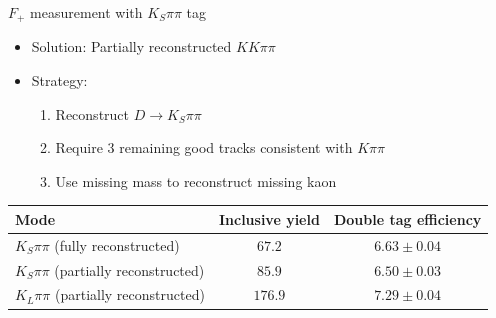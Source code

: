 \documentclass{beamer}
\begin{document}
\begin{frame}{$F_+$ measurement with $K_S\pi\pi$ tag}
  \begin{itemize}
    \setlength\itemsep{1.0em}
    \item{Solution: Partially reconstructed $KK\pi\pi$}
    \item{Strategy:}
    \begin{enumerate}
      \setlength\itemsep{0.5em}
      \item{Reconstruct $D\to K_S\pi\pi$}
      \item{Require 3 remaining good tracks consistent with $K\pi\pi$}
      \item{Use missing mass to reconstruct missing kaon}
    \end{enumerate}
  \end{itemize}
  \vspace{0.5cm}
  \def\arraystretch{1.2}%
  \begin{tabular}{l|c|c}
    Mode                                     & Inclusive yield & Double tag efficiency \\
    \hline
    $K_S\pi\pi$ (fully reconstructed)        & $67.2$          & $6.63 \pm 0.04$ \\
    $K_S\pi\pi$ (partially reconstructed)    & $85.9$          & $6.50 \pm 0.03$ \\
    $K_L\pi\pi$ (partially reconstructed)    & $176.9$         & $7.29 \pm 0.04$ \\
    \hline
  \end{tabular}
\end{frame}
\end{document}
